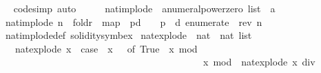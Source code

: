 \begin{isabellebody}
%
\isadelimproof
\ \ %
\endisadelimproof
%
\isatagproof
{}\isamarkupfalse%
{\isacharparenleft}{\kern0pt}code{\isacharunderscore}{\kern0pt}simp{\isacharcomma}{\kern0pt}\ auto{\isacharparenright}{\kern0pt}%
\endisatagproof
{\isafoldproof}%
%
\isadelimproof
\ \isanewline
%
\endisadelimproof
\isanewline
{}\isamarkupfalse%
\ \isanewline
\ \ nat{\isacharunderscore}{\kern0pt}implode\ {\isacharcolon}{\kern0pt}{\isacharcolon}{\kern0pt}\ {\isacartoucheopen}{\isacharprime}{\kern0pt}a{\isacharcolon}{\kern0pt}{\isacharcolon}{\kern0pt}{\isacharbraceleft}{\kern0pt}numeral{\isacharcomma}{\kern0pt}power{\isacharcomma}{\kern0pt}zero{\isacharbraceright}{\kern0pt}\ list\ {\isasymRightarrow}\ {\isacharprime}{\kern0pt}a{\isacartoucheclose}\ \isanewline
\ {\isacartoucheopen}nat{\isacharunderscore}{\kern0pt}implode\ n\ {\isacharequal}{\kern0pt}\ foldr\ {\isacharparenleft}{\kern0pt}{\isacharplus}{\kern0pt}{\isacharparenright}{\kern0pt}\ {\isacharparenleft}{\kern0pt}map\ {\isacharparenleft}{\kern0pt}{\isasymlambda}\ {\isacharparenleft}{\kern0pt}p{\isacharcomma}{\kern0pt}d{\isacharparenright}{\kern0pt}\ {\isasymRightarrow}\ {}{}\ {\isacharcircum}{\kern0pt}\ p\ {\isacharasterisk}{\kern0pt}\ d{\isacharparenright}{\kern0pt}\ {\isacharparenleft}{\kern0pt}enumerate\ {}\ {\isacharparenleft}{\kern0pt}rev\ n{\isacharparenright}{\kern0pt}{\isacharparenright}{\kern0pt}{\isacharparenright}{\kern0pt}\ {}{\isacartoucheclose}\isanewline
\isanewline
\isanewline
{}\isamarkupfalse%
\ nat{\isacharunderscore}{\kern0pt}implode{\isacharunderscore}{\kern0pt}def\ {\isacharbrackleft}{\kern0pt}solidity{\isacharunderscore}{\kern0pt}symbex{\isacharbrackright}{\kern0pt}\isanewline
\isanewline
{}\isamarkupfalse%
\ nat{\isacharunderscore}{\kern0pt}explode{\isacharprime}{\kern0pt}\ {\isacharcolon}{\kern0pt}{\isacharcolon}{\kern0pt}\ {\isacartoucheopen}nat\ {\isasymRightarrow}\ nat\ list{\isacartoucheclose}\ \ \isanewline
\ \ \ {\isacartoucheopen}nat{\isacharunderscore}{\kern0pt}explode{\isacharprime}{\kern0pt}\ x\ {\isacharequal}{\kern0pt}\ {\isacharparenleft}{\kern0pt}case\ \ x\ {\isacharless}{\kern0pt}\ {}{}\ of\ True\ {\isasymRightarrow}\ {\isacharbrackleft}{\kern0pt}x\ mod\ {}{}{\isacharbrackright}{\kern0pt}\ \isanewline
\ \ \ \ \ \ \ \ \ \ \ \ \ \ \ \ \ \ \ \ \ \ \ \ \ \ \ \ \ \ \ \ \ \ \ \ \ \ \ {\isacharbar}{\kern0pt}\ {\isacharunderscore}{\kern0pt}\ {\isasymRightarrow}\ {\isacharparenleft}{\kern0pt}x\ mod\ {}{}\ {\isacharparenright}{\kern0pt}{\isacharhash}{\kern0pt}{\isacharparenleft}{\kern0pt}nat{\isacharunderscore}{\kern0pt}explode{\isacharprime}{\kern0pt}\ {\isacharparenleft}{\kern0pt}x\ div\ {}{}{\isacharparenright}{\kern0pt}{\isacharparenright}{\kern0pt}{\isacharparenright}{\kern0pt}{\isacartoucheclose}\isanewline

\end{isabellebody}
